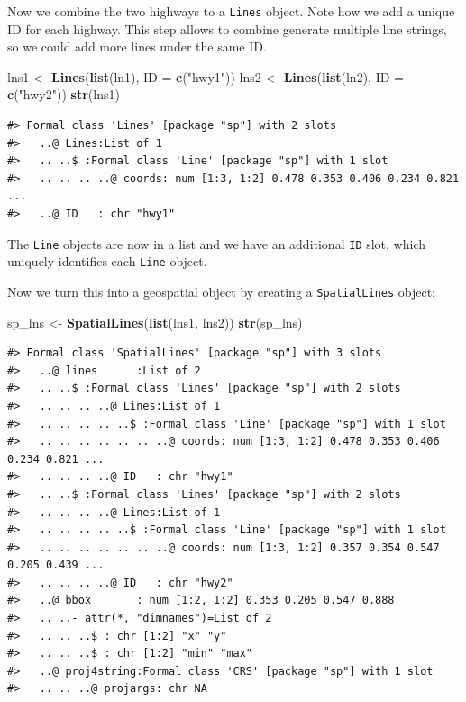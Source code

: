 \documentclass[]{book}
\newenvironment{Shaded}{\begin{snugshade}}{\end{snugshade}}
\newcommand{\KeywordTok}[1]{\textcolor[rgb]{0.13,0.29,0.53}{\textbf{#1}}}
\newcommand{\DataTypeTok}[1]{\textcolor[rgb]{0.13,0.29,0.53}{#1}}
\newcommand{\StringTok}[1]{\textcolor[rgb]{0.31,0.60,0.02}{#1}}
\newcommand{\NormalTok}[1]{#1}
\begin{document}
Now we combine the two highways to a \texttt{Lines} object. Note how we
add a unique ID for each highway. This step allows to combine generate
multiple line strings, so we could add more lines under the same ID.

\begin{Shaded}
\begin{Highlighting}[]
\NormalTok{lns1 <-}\StringTok{ }\KeywordTok{Lines}\NormalTok{(}\KeywordTok{list}\NormalTok{(ln1), }\DataTypeTok{ID =} \KeywordTok{c}\NormalTok{(}\StringTok{"hwy1"}\NormalTok{)) }
\NormalTok{lns2 <-}\StringTok{ }\KeywordTok{Lines}\NormalTok{(}\KeywordTok{list}\NormalTok{(ln2), }\DataTypeTok{ID =} \KeywordTok{c}\NormalTok{(}\StringTok{"hwy2"}\NormalTok{)) }
\KeywordTok{str}\NormalTok{(lns1)}
\end{Highlighting}
\end{Shaded}

\begin{verbatim}
#> Formal class 'Lines' [package "sp"] with 2 slots
#>   ..@ Lines:List of 1
#>   .. ..$ :Formal class 'Line' [package "sp"] with 1 slot
#>   .. .. .. ..@ coords: num [1:3, 1:2] 0.478 0.353 0.406 0.234 0.821 ...
#>   ..@ ID   : chr "hwy1"
\end{verbatim}

The \texttt{Line} objects are now in a list and we have an additional
\texttt{ID} slot, which uniquely identifies each \texttt{Line} object.

Now we turn this into a geospatial object by creating a
\texttt{SpatialLines} object:

\begin{Shaded}
\begin{Highlighting}[]
\NormalTok{sp_lns <-}\StringTok{ }\KeywordTok{SpatialLines}\NormalTok{(}\KeywordTok{list}\NormalTok{(lns1, lns2))}
\KeywordTok{str}\NormalTok{(sp_lns)}
\end{Highlighting}
\end{Shaded}

\begin{verbatim}
#> Formal class 'SpatialLines' [package "sp"] with 3 slots
#>   ..@ lines      :List of 2
#>   .. ..$ :Formal class 'Lines' [package "sp"] with 2 slots
#>   .. .. .. ..@ Lines:List of 1
#>   .. .. .. .. ..$ :Formal class 'Line' [package "sp"] with 1 slot
#>   .. .. .. .. .. .. ..@ coords: num [1:3, 1:2] 0.478 0.353 0.406 0.234 0.821 ...
#>   .. .. .. ..@ ID   : chr "hwy1"
#>   .. ..$ :Formal class 'Lines' [package "sp"] with 2 slots
#>   .. .. .. ..@ Lines:List of 1
#>   .. .. .. .. ..$ :Formal class 'Line' [package "sp"] with 1 slot
#>   .. .. .. .. .. .. ..@ coords: num [1:3, 1:2] 0.357 0.354 0.547 0.205 0.439 ...
#>   .. .. .. ..@ ID   : chr "hwy2"
#>   ..@ bbox       : num [1:2, 1:2] 0.353 0.205 0.547 0.888
#>   .. ..- attr(*, "dimnames")=List of 2
#>   .. .. ..$ : chr [1:2] "x" "y"
#>   .. .. ..$ : chr [1:2] "min" "max"
#>   ..@ proj4string:Formal class 'CRS' [package "sp"] with 1 slot
#>   .. .. ..@ projargs: chr NA
\end{verbatim}
\end{document}
